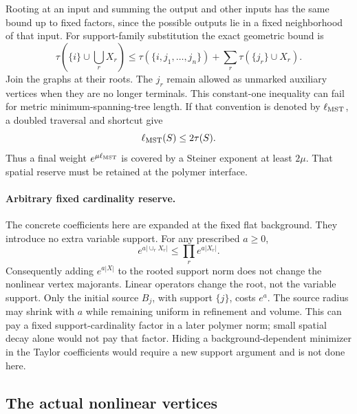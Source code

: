 Rooting at an input and summing the output and other inputs
has the same bound up to fixed factors, since the possible
outputs lie in a fixed neighborhood of that input.
For support-family substitution the exact geometric bound is
\begin{equation}\label{cv-tree-union}
 \tau\left(\{i\}\cup\bigcup_rX_r\right)
 \le\tau(\{i,j_1,\ldots,j_n\})
                    +\sum_r\tau(\{j_r\}\cup X_r).
\end{equation}
Join the graphs at their roots. The $j_r$ remain allowed as
unmarked auxiliary vertices when they are no longer terminals.
This constant-one inequality can fail for metric
minimum-spanning-tree length. If that convention is denoted
by $\ell_{\rm MST}$, a doubled traversal and shortcut give
\begin{equation}\label{cv-mst-conversion}
 \ell_{\rm MST}(S)\le2\tau(S).
\end{equation}
Thus a final weight $e^{\mu\ell_{\rm MST}}$ is covered by
a Steiner exponent at least $2\mu$. That spatial reserve
must be retained at the polymer interface.

\paragraph{Arbitrary fixed cardinality reserve.}
The concrete coefficients here are expanded at the fixed
flat background. They introduce no extra variable support.
For any prescribed $a\ge0$,
\begin{equation}\label{cv-cardinality}
 e^{a|\cup_rX_r|}\le\prod_re^{a|X_r|}.
\end{equation}
Consequently adding $e^{a|X|}$ to the rooted support norm
does not change the nonlinear vertex majorants. Linear
operators change the root, not the variable support. Only
the initial source $B_j$, with support $\{j\}$, costs
$e^a$. The source radius may shrink with $a$ while remaining
uniform in refinement and volume. This can pay a fixed
support-cardinality factor in a later polymer norm; small
spatial decay alone would not pay that factor. Hiding a
background-dependent minimizer in the Taylor coefficients
would require a new support argument and is not done here.

\subsection{The actual nonlinear vertices}
\label{cv-concrete-section}


